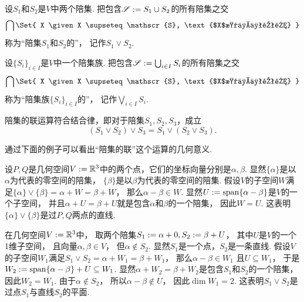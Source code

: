 \begin{definition}
设\(S_1\)和\(S_2\)是\(V\)中两个陪集.
把包含\(\mathscr{S} := S_1 \cup S_2\)的所有陪集之交\begin{equation*}
	\bigcap\Set{
		X
		\given
		X \supseteq \mathscr{S},
		\text{$X$是一个陪集}
	}
\end{equation*}
称为“陪集\(S_1\)和\(S_2\)的”，
记作\(S_1 \vee S_2\).
\end{definition}

\begin{definition}
设\(\{S_i\}_{i \in I}\)是\(V\)中一个陪集族.
把包含\(\mathscr{S} := \bigcup_{i \in I} S_i\)的所有陪集之交\begin{equation*}
	\bigcap\Set{
		X
		\given
		X \supseteq \mathscr{S},
		\text{$X$是一个陪集}
	}
\end{equation*}
称为“陪集族\(\{S_i\}_{i \in I}\)的”，
记作\(\bigvee_{i \in I} S_i\).
\end{definition}

陪集的联运算符合结合律，即对于陪集\(S_1,S_2,S_3\)，成立\begin{equation}
	(S_1 \vee S_2) \vee S_3 = S_1 \vee (S_2 \vee S_3).
\end{equation}

通过下面的例子可以看出“陪集的联”这个运算的几何意义.
\begin{example}
设\(P,Q\)是几何空间\(V := \mathbb{R}^3\)中的两个点，它们的坐标向量分别是\(\alpha,\beta\).
显然\(\{\alpha\}\)是以\(\alpha\)为代表的零空间的陪集，
\(\{\beta\}\)是以\(\beta\)为代表的零空间的陪集.
假设\(V\)的子空间\(W\)满足\(
	\{\alpha\} \vee \{\beta\}
	= \alpha + W
	= \beta + W
\)，
那么\(\alpha - \beta \in W\).
显然\(U := \operatorname{span}\{\alpha - \beta\}\)是\(V\)的一个子空间，
并且\(\alpha + U = \beta + U\)就是包含\(\alpha\)和\(\beta\)的一个陪集，
因此\(W = U\).
这表明\(\{\alpha\} \vee \{\beta\}\)是过\(P,Q\)两点的直线.
\end{example}

\begin{example}
在几何空间\(V := \mathbb{R}^3\)中，
取两个陪集\(
	S_1 := \alpha + 0,
	S_2 := \beta + U
\)，
其中\(U\)是\(V\)的一个1维子空间，
且向量\(\alpha,\beta \in V\)，
但\(\alpha \notin S_2\).
显然\(S_1\)是一个点，\(S_2\)是一条直线.
假设\(V\)的子空间\(W_1\)满足\(
	S_1 \vee S_2
	= \alpha + W_1
	= \beta + W_1
\)，
那么\(\alpha - \beta \in W_1\)
且\(U \subseteq W_1\)，
于是\(
	W_2
	\allowbreak
	:= \operatorname{span}\{\alpha - \beta\} + U
	\allowbreak
	\subseteq W_1
\).
显然\(\alpha + W_2 = \beta + W_2\)是包含\(S_1\)和\(S_2\)的一个陪集，
因此\(W_2 = W_1\).
由于\(\alpha \notin S_2\)，
所以\(\alpha - \beta \notin U\)，
因此\(\dim W_1 = 2\).
这表明\(S_1 \vee S_2\)是过点\(S_1\)与直线\(S_2\)的平面.
\end{example}
